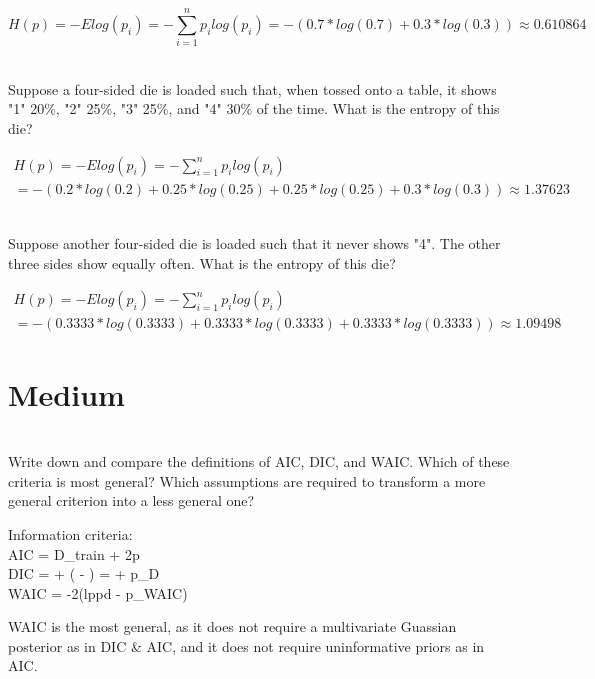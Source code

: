 \documentclass[12pt]{article}\usepackage[]{graphicx}\usepackage[]{color}
\newenvironment{problem}[2][Problem]{\begin{trivlist}
\item[\hskip \labelsep {\bfseries #1}\hskip \labelsep {\bfseries #2.}]}{\end{trivlist}}
\begin{document}
$$H(p) = -Elog(p_i) = -\sum_{i=1}^{n} p_ilog(p_i) = -(0.7*log(0.7) + 0.3*log(0.3)) \approx 0.610864$$

\begin{problem}{6E3}
\text{ }\\
Suppose a four-sided die is loaded such that, when tossed onto a table, it shows "1" 20\%, "2" 25\%, "3" 25\%, and "4" 30\% of the time. What is the entropy of this die?
\end{problem}

\begin{multline*}
H(p) = -Elog(p_i) = -\sum_{i=1}^{n} p_ilog(p_i) \\ = -(0.2*log(0.2) + 0.25*log(0.25) + 0.25*log(0.25) + 0.3*log(0.3)) \approx 1.37623
\end{multline*}

\begin{problem}{6E4}
\text{ }\\
Suppose another four-sided die is loaded such that it never shows "4". The other three sides show equally often. What is the entropy of this die?
\end{problem}

\begin{multline*}
H(p) = -Elog(p_i) = -\sum_{i=1}^{n} p_ilog(p_i) \\ = -(0.3333*log(0.3333) + 0.3333*log(0.3333) + 0.3333*log(0.3333)) \approx 1.09498
\end{multline*}

\section{Medium}

\begin{problem}{6M1}
\text{ }\\
Write down and compare the definitions of AIC, DIC, and WAIC. Which of these criteria is most general? Which assumptions are required to transform a more general criterion into a less general one?
\end{problem}

Information criteria: \\
AIC = D_train + 2p \\
DIC =  + ( - ) =  + p_D \\
WAIC = -2(lppd - p_WAIC)

WAIC is the most general, as it does not require a multivariate Guassian posterior as in DIC & AIC, and it does not require uninformative priors as in AIC.
\end{document}
